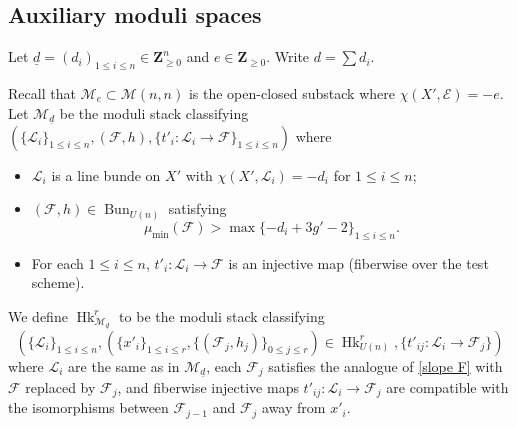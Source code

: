 \documentclass[reqno]{amsart}
\numberwithin{equation}{section}
\newcommand{\Z}{\mathbf{Z}}
\DeclareMathOperator{\Bun}{Bun}
\DeclareMathOperator{\Hk}{Hk}
\newcommand\un{\underline}
\newcommand\xr{\xrightarrow}
\newcommand{\s}{\sigma}
\newcommand\cE{\mathcal{E}}
\newcommand\cF{\mathcal{F}}
\newcommand\cL{\mathcal{L}}
\newcommand\cM{\mathcal{M}}
\theoremstyle{remark}
\numberwithin{equation}{section}
\begin{document}
\subsection{Auxiliary moduli spaces}
Let $\un d=(d_{i})_{1\le i\le n}\in \Z^{n}_{\ge0}$ and $e\in \Z_{\ge0}$. Write $d=\sum d_{i}$. 

Recall that $\cM_{e}\subset \cM(n,n)$ is the open-closed substack where $\chi(X',\cE)=-e$. Let $\cM_{\un d}$ be the moduli stack classifying $(\{\cL_{i}\}_{1\le i\le n}, (\cF,h),\{t'_{i}:\cL_{i}\to \cF\}_{1\le i\le n})$ where
\begin{itemize}
\item $\cL_{i}$ is a line bunde on $X'$ with $\chi(X',\cL_{i})=-d_{i}$ for $1\le i\le n$;
\item $(\cF,h)\in \Bun_{U(n)}$ satisfying
\begin{equation}\label{slope F}
\mu_{\min}(\cF)>\max\{-d_{i}+3g'-2\}_{1\le i\le n}.
\end{equation}
\item For each $1\le i\le n$, $t'_{i}: \cL_{i}\to \cF$ is an injective map (fiberwise over the test scheme).
\end{itemize}
We define $\Hk^{r}_{\cM_{\un d}}$ to be the moduli stack classifying
\begin{equation*}
(\{\cL_{i}\}_{1\le i\le n}, (\{x'_{i}\}_{1\le i\le r}, \{(\cF_{j},h_{j})\}_{0\le j\le r})\in \Hk^{r}_{U(n)},\{t'_{ij}:\cL_{i}\to \cF_{j}\})
\end{equation*}
where  $\cL_{i}$ are the same  as in $\cM_{\un d}$, each $\cF_{j}$ satisfies the analogue of \eqref{slope F} with $\cF$ replaced by $\cF_{j}$, and fiberwise injective maps $t'_{ij}:\cL_{i}\to \cF_{j}$ are compatible with the isomorphisms between $\cF_{j-1}$ and $\cF_{j}$ away from $x'_{i}$.
\end{document}
